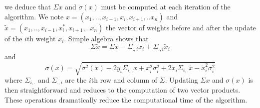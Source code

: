 we deduce that $\Sigma x$ and $\sigma (x) $ must be computed at each iteration of the algorithm. We note $x = (x_1,.., x_{i-1}, x_i, x_{i+1},..x_n)$ and $\tilde{x} =(x_1,.., x_{i-1}, x_i^*, x_{i+1},..x_n)$ the vector of weights before and after the update of the $i$th weight $x_i$. Simple algebra shows that
\begin{equation}
\Sigma \tilde{x} = \Sigma x - \Sigma_{.,i} x_i + \Sigma_{.,i}\tilde{x}_i
\end{equation}
and
\begin{equation}
\sigma(x) = \sqrt{\sigma^2(x) - 2y_i\Sigma_{i,.}x + x_i^2\sigma_i^2 + 2\tilde{x}_i\Sigma_{i,.}\tilde{x} -  \tilde{x}_i^2\sigma_i^2}
\end{equation}
where $\Sigma_{i,.}$ and $\Sigma_{.,i}$ are the $i$th row and column of $\Sigma$. Updating $\Sigma x$ and $\sigma(x)$ is then straightforward and reduces to the computation of two vector products. These operations dramatically reduce the computational time of the algorithm.

